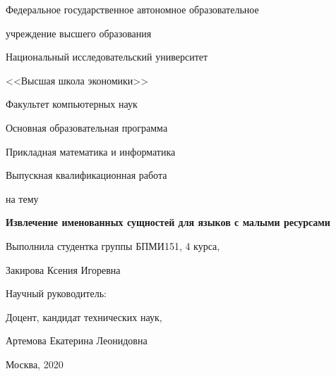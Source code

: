 
\large
\bigskip

\begin{center}
{\large Федеральное государственное автономное образовательное 

учреждение высшего образования

Национальный исследовательский университет

\smallskip

<<Высшая школа экономики>>

}

\bigskip
\bigskip
\bigskip

{ \large
Факультет компьютерных наук

Основная образовательная программа

Прикладная математика и информатика
}
\end{center}

\begin{center}
  {\large Выпускная квалификационная работа}
  
  {\large на тему}
\end{center}

\begin{center}
  \textbf{\huge Извлечение именованных сущностей для языков с малыми ресурсами}
\end{center}


\renewcommand{\arraystretch}{1.8} %

\bigskip
\bigskip
\bigskip
\bigskip

{\large Выполнила студентка группы БПМИ151, 4 курса,

\hspace{3cm} Закирова Ксения Игоревна


Научный руководитель:

\hspace{3cm} Доцент, кандидат технических наук,

\hspace{3cm} Артемова Екатерина Леонидовна


}
    
\bigskip
\bigskip

\bigskip
\bigskip
\bigskip
\pagestyle{empty}

\vfill
\begin{center}
  {Москва, 2020}
\end{center}

\newpage